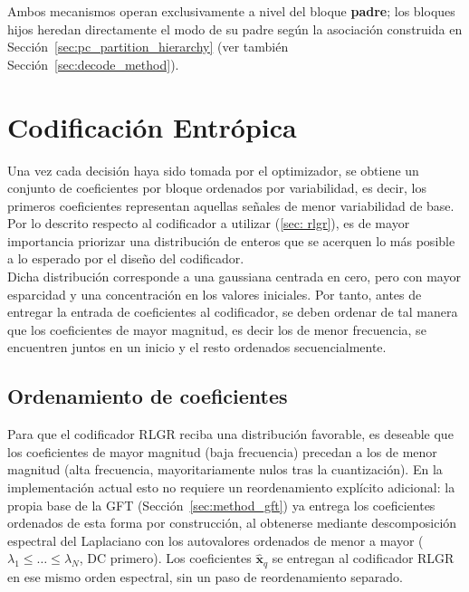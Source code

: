     Ambos mecanismos operan exclusivamente a nivel del bloque \textbf{padre}; los bloques hijos
    heredan directamente el modo de su padre según la asociación construida en
    Sección~\ref{sec:pc_partition_hierarchy} (ver también Sección~\ref{sec:decode_method}).

\section{Codificación Entrópica}\label{sec:rlgr_method}
   Una vez cada decisión haya sido tomada por el optimizador, se obtiene un conjunto de coeficientes por bloque ordenados por variabilidad, es decir, los primeros coeficientes representan aquellas señales de menor variabilidad de base. Por lo descrito respecto al codificador a utilizar (\ref{sec: rlgr}), es de mayor importancia priorizar una distribución de enteros que se acerquen lo más posible a lo esperado por el diseño del codificador.\\
   
   Dicha distribución corresponde a una gaussiana centrada en cero, pero con mayor esparcidad y una concentración en los valores iniciales. Por tanto, antes de entregar la entrada de coeficientes al codificador, se deben ordenar de tal manera que los coeficientes de mayor magnitud, es decir los de menor frecuencia, se encuentren juntos en un inicio y el resto ordenados secuencialmente.


   \subsection{Ordenamiento de coeficientes}

   Para que el codificador RLGR reciba una distribución favorable, es deseable que los
   coeficientes de mayor magnitud (baja frecuencia) precedan a los de menor magnitud (alta
   frecuencia, mayoritariamente nulos tras la cuantización). En la implementación actual esto no
   requiere un reordenamiento explícito adicional: la propia base de la GFT
   (Sección~\ref{sec:method_gft}) ya entrega los coeficientes ordenados de esta forma por
   construcción, al obtenerse mediante descomposición espectral del Laplaciano con los
   autovalores ordenados de menor a mayor ($\lambda_1 \leq \dots \leq \lambda_N$, DC primero).
   Los coeficientes $\hat{\mathbf{x}}_q$ se entregan al codificador RLGR en ese mismo orden
   espectral, sin un paso de reordenamiento separado.

